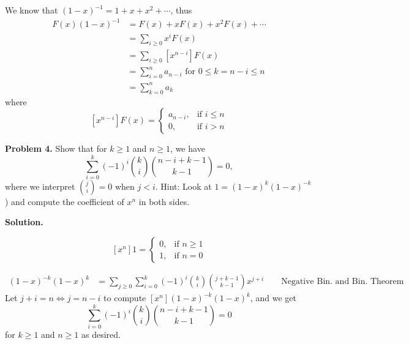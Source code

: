 We know that $ (1-x)^{-1}=1+x+x^2+\cdots $, thus
\begin{align*}
    F(x)(1-x)^{-1}
     & = F(x)+xF(x)+x^2F(x)+\cdots                                    \\
     & =\sum\limits_{i\geqslant 0}x^{i} F(x)                          \\
     & =\sum\limits_{i\geqslant 0}[x^{n-i}] F(x)                      \\
     & =\sum\limits_{i= 0}^{n} a_{n-i} \text{ for } 0\leq k=n-i\leq n \\
     & =\sum\limits_{k=0}^{n} a_k
\end{align*}
where
\[ [x^{n-i}]F(x)
    =\begin{cases}
        a_{n-i}, & \text{if } i\leqslant n \\
        0,       & \text{if } i>n
    \end{cases}
\]

\textbf{Problem 4.} Show that for $ k\geqslant 1 $ and $ n\geqslant 1 $, we have
\[ \sum\limits_{i=0}^{k} (-1)^i\binom{k}{i}\binom{n-i+k-1}{k-1}=0, \]
where we interpret $ \binom{j}{i}=0 $ when $ j<i $.
Hint: Look at $ 1=(1-x)^{k}(1-x)^{-k} $) and compute the coefficient of $ x^n $
in both sides.

\textbf{Solution.}

\[ [x^n]1=
    \begin{cases}
        0, & \text{if } n\geqslant 1 \\
        1, & \text{if } n=0
    \end{cases}
\]

\begin{align*}
    (1-x)^{-k}(1-x)^k
    &= \sum\limits_{j\geqslant 0} \sum\limits_{i=0}^{k}
    (-1)^i\binom{k}{i}\binom{j+k-1}{k-1}x^{j+i}\qquad\text{Negative Bin. and Bin. Theorem}
\end{align*}
Let $ j+i=n\iff j=n-i $ to compute $ [x^n](1-x)^{-k}(1-x)^k $, and we get
\[ \sum\limits_{i=0}^{k} (-1)^i\binom{k}{i}\binom{n-i+k-1}{k-1}=0 \]
for $ k\geqslant 1 $ and $ n\geqslant 1 $ as desired.
